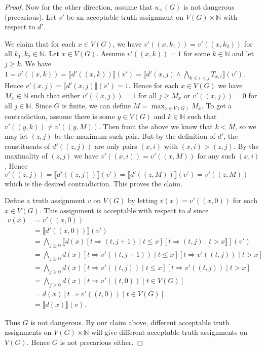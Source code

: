 \documentclass[12pt]{kluwer}
\theoremstyle{remark}
\begin{document}
\begin{proof}
Now for the other direction, assume that $u_{<}(G)$ is not dangerous (precarious). Let $v'$ be an acceptable truth assignment on $V(G) \times \mathbb{N}$ with respect to $d'$.\newline

We claim that for each $x \in V(G)$, we have $v'((x, k_1)) = v'((x, k_2))$ for all $k_1, k_2 \in \mathbb{N}$.  Let $x \in V(G)$.  Assume $v'((x, k)) = 1$ for some $k \in \mathbb{N}$ and let $j \geq k$. We have $1 = v'((x,k)) = \llbracket d'((x,k))\rrbracket(v') = \llbracket d'(x, j) \wedge \bigwedge_{k \leq i < j} T_{x, i}\rrbracket(v')$.  Hence $v'(x, j) = \llbracket d'(x, j)\rrbracket(v') = 1$. Hence for each $x \in V(G)$ we have $M_x \in \mathbb{N}$ such that either $v'((x , j)) = 1$ for all $j \geq M_x$ or $v'((x, j)) = 0$ for all $j \in \mathbb{N}$.  Since $G$ is finite, we can define $M = \max_{x \in V(G)} M_x$.  To get a contradiction, assume there is some $y \in V(G)$ and $k \in \mathbb{N}$ such that $v'((y, k)) \neq v'((y, M))$.  Then from the above we know that $k < M$, so we may let $(z, j)$ be the maximum such pair.  But by the definition of $d'$, the constituents of $d'((z, j))$ are only pairs $(x, i)$ with $(x, i) > (z, j)$.  By the maximality of $(z, j)$ we have $v'((x, i)) = v'((x, M))$ for any such $(x, i)$.  Hence $v'((z, j)) = \llbracket d'((z, j)) \rrbracket (v') = \llbracket d'((z, M)) \rrbracket (v') = v'((z, M))$ which is the desired contradiction. This proves the claim.\newline

Define a truth assignment $v$ on $V(G)$ by letting $v(x) = v'((x,0))$ for each $x \in V(G)$. This assignment is acceptable with respect to $d$ since
\begin{align*}
v(x) &= v'((x, 0)) \\
&= \llbracket d'((x, 0))\rrbracket (v') \\
&= \bigwedge_{j \geq 0} \llbracket d(x)[t \Rightarrow (t, j + 1) \mid t \leq x][t \Rightarrow (t, j) \mid t > x\rrbracket ](v') \\
&= \bigwedge_{j \geq 0} d(x)[t \Rightarrow v'((t, j + 1)) \mid t \leq x][t \Rightarrow v'((t, j)) \mid t > x] \\
&= \bigwedge_{j \geq 0} d(x)[t \Rightarrow v'((t, j)) \mid t \leq x][t \Rightarrow v'((t, j)) \mid t > x] \\
&= \bigwedge_{j \geq 0} d(x)[t \Rightarrow v'((t, 0)) \mid t \in V(G)] \\
&= d(x)[t \Rightarrow v'((t, 0)) \mid t \in V(G)] \\
&= \llbracket d(x)\rrbracket (v).
\end{align*}

Thus $G$ is not dangerous. By our claim above, different acceptable truth assignments on $V(G) \times \mathbb{N}$ will give different acceptable truth assignments on $V(G)$.  Hence $G$ is not precarious either.
\end{proof}
\end{document}
